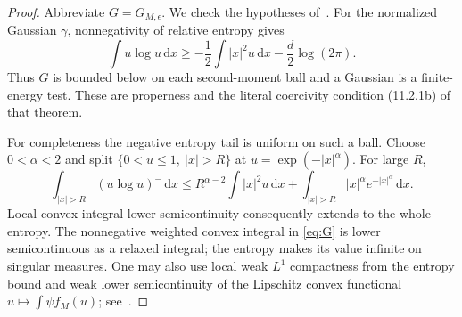 \documentclass[11pt]{article}
\numberwithin{equation}{section}
\theoremstyle{definition}
\theoremstyle{remark}
\newcommand{\dd}{\,\mathrm d}
\begin{document}
\begin{proof}
Abbreviate $G=G_{M,\epsilon}$. We check the hypotheses
of~\cite[Theorem~11.2.1]{AGS}.
For the normalized Gaussian $\gamma$, nonnegativity of relative entropy gives
\begin{equation}\label{eq:entropy-lower}
 \int u\log u\dd x\ge-\frac12\int|x|^2u\dd x-\frac d2\log(2\pi).
\end{equation}
Thus $G$ is bounded below on each second-moment ball and a Gaussian is a
finite-energy test. These are properness and the literal coercivity
condition (11.2.1b) of that theorem.

For completeness the negative entropy tail is uniform on such a ball.
Choose $0<\alpha<2$ and split $\{0<u\le1,\ |x|>R\}$ at
$u=\exp(-|x|^\alpha)$. For large $R$,
\begin{equation}\label{eq:entropy-tail}
 \int_{|x|>R}(u\log u)^-\dd x
 \le R^{\alpha-2}\int|x|^2u\dd x
       +\int_{|x|>R}|x|^\alpha e^{-|x|^\alpha}\dd x.
\end{equation}
Local convex-integral lower semicontinuity consequently extends to the
whole entropy. The nonnegative weighted convex integral in \eqref{eq:G}
is lower semicontinuous as a relaxed integral; the entropy makes its value
infinite on singular measures. One may also use local weak $L^1$
compactness from the entropy bound and weak lower semicontinuity of the
Lipschitz convex functional $u\mapsto\int\psi f_M(u)$;
see~\cite[Corollary~3.9 and Theorem~4.30]{Brezis}.


\end{proof}
\end{document}
